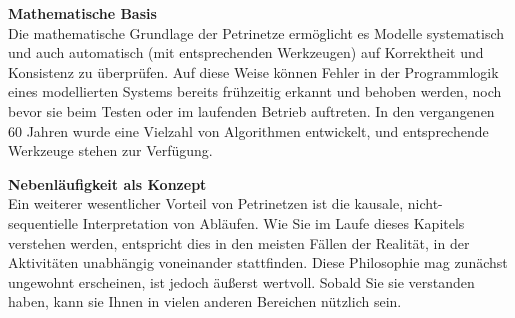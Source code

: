 \textbf{Mathematische Basis}\\
Die mathematische Grundlage der Petrinetze ermöglicht es Modelle systematisch und auch automatisch (mit entsprechenden Werkzeugen) auf Korrektheit und Konsistenz zu überprüfen. Auf diese Weise können Fehler in der Programmlogik eines modellierten Systems bereits frühzeitig erkannt und behoben werden, noch bevor sie beim Testen oder im laufenden Betrieb auftreten. In den vergangenen 60 Jahren wurde eine Vielzahl von Algorithmen entwickelt, und entsprechende Werkzeuge stehen zur Verfügung.

\textbf{Nebenläufigkeit als Konzept}\\
Ein weiterer wesentlicher Vorteil von Petrinetzen ist die kausale, nicht-sequentielle Interpretation von Abläufen. Wie Sie im Laufe dieses Kapitels verstehen werden, entspricht dies in den meisten Fällen der Realität, in der Aktivitäten unabhängig voneinander stattfinden. Diese Philosophie mag zunächst ungewohnt erscheinen, ist jedoch äußerst wertvoll. Sobald Sie sie verstanden haben, kann sie Ihnen in vielen anderen Bereichen nützlich sein.

